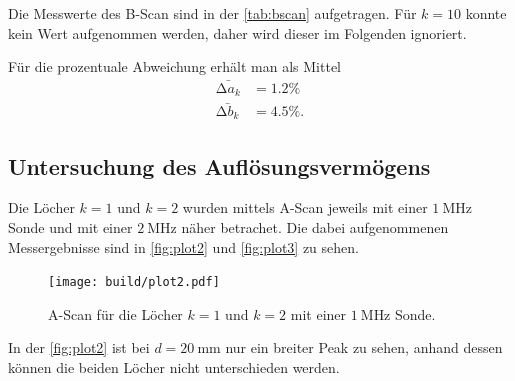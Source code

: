 Die Messwerte des B-Scan sind in der \autoref{tab:bscan} aufgetragen. Für $k =10$ konnte kein Wert aufgenommen werden, daher wird dieser
im Folgenden ignoriert.
\begin{table}[H]
    \centering
    \caption{Messwerte des B-Scan.}
	
    \label{tab:bscan}
\end{table}

Für die prozentuale Abweichung erhält man als Mittel
\begin{align*}
\bar{\increment a_k} &= 1.2 \% \\
\bar{\increment b_k} &= 4.5 \%.
\end{align*}


\subsection{Untersuchung des Auflösungsvermögens} %
\label{sec:Untersuchung des Auslösungsverfahrens}

Die Löcher $k = 1$ und $k = 2$ wurden mittels A-Scan jeweils mit einer $\SI{1}{\mega\hertz}$ Sonde und mit einer
$\SI{2}{\mega\hertz}$ näher betrachet. Die dabei aufgenommenen Messergebnisse sind in \autoref{fig:plot2} und \autoref{fig:plot3}
zu sehen.

\begin{figure}[H]
	\texttt{[image: build/plot2.pdf]}
	\captionsetup{width=0.765\linewidth}
	\caption{A-Scan für die Löcher $k = 1$ und $k = 2$ mit einer $\SI{1}{\mega\hertz}$ Sonde.}
	\label{fig:plot2}
\end{figure}
In der \autoref{fig:plot2} ist bei $d = \SI{20}{\milli\meter}$ nur ein breiter Peak zu sehen, anhand dessen können die beiden Löcher nicht unterschieden werden.


